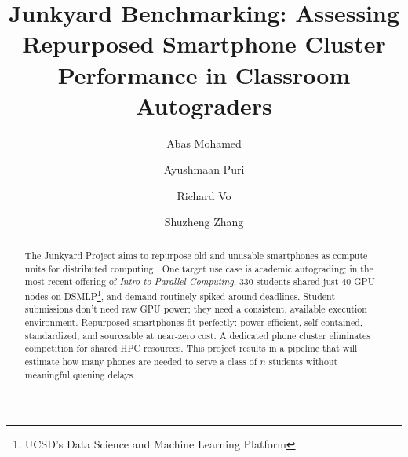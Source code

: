 \documentclass[acmlarge]{acmart}
\begin{document}
\title{Junkyard Benchmarking: Assessing Repurposed Smartphone Cluster Performance in Classroom Autograders}

\author{Abas Mohamed}

\author{Ayushmaan Puri}
\authornotemark[1]

\author{Richard Vo}
\authornotemark[1]

\author{Shuzheng Zhang}
\authornotemark[1]



\begin{abstract}

The Junkyard Project \cite{10.1145/3575693.3575710} aims to repurpose old and unusable smartphones as compute units for distributed computing \cite{switzer2025hardware}. One target use case is academic autograding; in the most recent offering of \textit{Intro to Parallel Computing}, 330 students shared just 40 GPU nodes on DSMLP\footnote{UCSD's Data Science and Machine Learning Platform}, and demand routinely spiked around deadlines. Student submissions don't need raw GPU power; they need a consistent, available execution environment. Repurposed smartphones fit perfectly: power-efficient, self-contained, standardized, and sourceable at near-zero cost. A dedicated phone cluster eliminates competition for shared HPC resources. This project results in a pipeline that will estimate how many phones are needed to serve a class of $n$ students without meaningful queuing delays.

\end{abstract}
\end{document}
